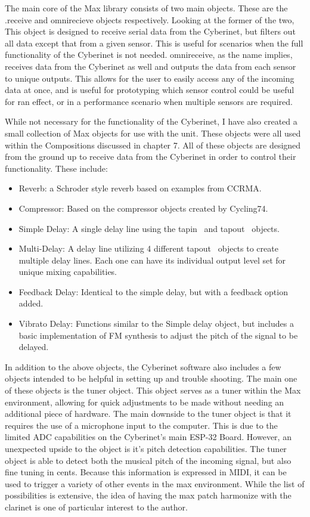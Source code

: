 The main core of the Max library consists of two main objects. These are the .receive and omnirecieve objects respectively. Looking at the former of the two, This object is designed to receive serial data from the Cyberinet, but filters out all data except that from a given sensor. This is useful for scenarios when the full functionality of the Cyberinet is not needed. omnireceive, as the name implies, receives data from the Cyberinet as well and outputs the data from each sensor to unique outputs. This allows for the user to easily access any of the incoming data at once, and is useful for prototyping which sensor control could be useful for ran effect, or in a performance scenario when multiple sensors are required.

While not necessary for the functionality of the Cyberinet, I have also created a small collection of Max objects for use with the unit. These objects were all used within the Compositions discussed in chapter 7. All of these objects are designed from the ground up to receive data from the Cyberinet in order to control their functionality. These include:

\begin{itemize}
    \item Reverb: a Schroder style reverb based on examples from CCRMA.
    \item Compressor: Based on the compressor objects created by Cycling74.
    \item Simple Delay: A single delay line using the tapin~ and tapout~ objects. 
    \item Multi-Delay: A delay line utilizing 4 different tapout~ objects to create multiple delay lines. Each one can have its individual output level set for unique mixing capabilities.
    \item Feedback Delay: Identical to the simple delay, but with a feedback option added.
    \item Vibrato Delay: Functions similar to the Simple delay object, but includes a basic implementation of FM synthesis to adjust the pitch of the signal to be delayed. 
\end{itemize}

In addition to the above objects, the Cyberinet software also includes a few objects intended to be helpful in setting up and trouble shooting. The main one of these objects is the tuner object. This object serves as a tuner within the Max environment, allowing for quick adjustments to be made without needing an additional piece of hardware. 
The main downside to the tuner object is that it requires the use of a microphone input to the computer. This is due to the limited ADC capabilities on the Cyberinet's main ESP-32 Board. However, an unexpected upside to the object is it's pitch detection capabilities. The tuner object is able to detect both the musical pitch of the incoming signal, but also fine tuning in cents. Because this information is expressed in MIDI, it can be used to trigger a variety of other events in the max environment. While the list of possibilities is extensive, the idea of having the max patch harmonize with the clarinet is one of particular interest to the author.

